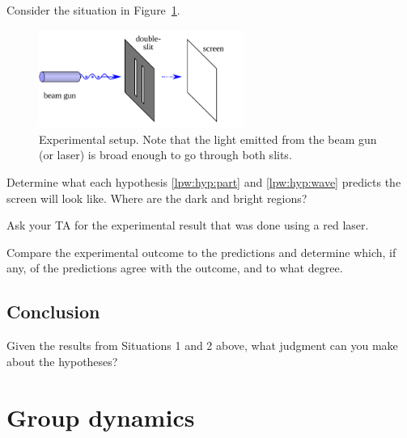 
Consider the situation in Figure~\ref{lpw:fig:2slit-setup}.

\begin{figure}
	\centering
	\includegraphics[width=0.6\textwidth]{light-particle-wave/Double-slit-setup.pdf}
	\caption{Experimental setup. Note that the light emitted from the beam gun (or laser) is broad enough to go through both slits.}\label{lpw:fig:2slit-setup}
\end{figure}

\begin{steps}
	\item Determine what each hypothesis \ref{lpw:hyp:part} and \ref{lpw:hyp:wave} predicts the screen will look like. Where are the dark and bright regions?
	
	\item Ask your TA for the experimental result that was done using a red laser.
	
	\item Compare the experimental outcome to the predictions and determine which, if any, of the predictions agree with the outcome, and to what degree.
\end{steps}




\subsection{Conclusion}

\begin{steps}
	\item Given the results from Situations 1 and 2 above, what judgment can you make about the hypotheses?
\end{steps}

\section{Group dynamics}


